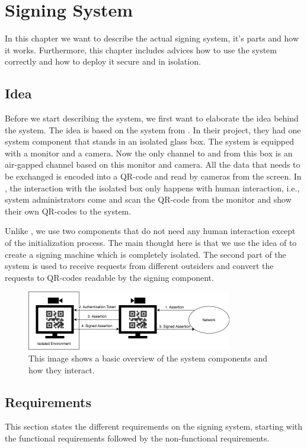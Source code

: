 \chapter{Signing System}\label{chapter:system}
In this chapter we want to describe the actual signing system, it's parts and how it works. Furthermore, this chapter includes advices how to use the system correctly and how to deploy it secure and in isolation.

\section{Idea}\label{sec:idea}
Before we start describing the system, we first want to elaborate the idea behind the system. The idea is based on the system from \citet{castle}. In their project, they had one system component that stands in an isolated glass box. The system is equipped with a monitor and a camera. Now the only channel to and from this box is an air-gapped channel based on this monitor and camera. All the data that needs to be exchanged is encoded into a QR-code and read by cameras from the screen. In \cite{castle}, the interaction with the isolated box only happens with human interaction, i.e., system administrators come and scan the QR-code from the monitor and show their own QR-codes to the system.

Unlike \cite{castle}, we use two components that do not need any human interaction except of the initialization process. The main thought here is that we use the idea of \cite{castle} to create a signing machine which is completely isolated. The second part of the system is used to receive requests from different outsiders and convert the requests to QR-codes readable by the signing component.

\begin{figure}
\centering
\includegraphics[width=0.8\textwidth]{images/SystemOverview.png}
\caption{This image shows a basic overview of the system components and how they interact.}
\label{fig:overview}
\end{figure}

\section{Requirements}\label{sec:requirements}
This section states the different requirements on the signing system, starting with the functional requirements followed by the non-functional requirements.

